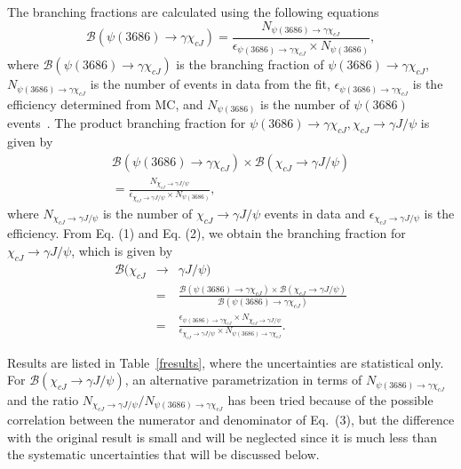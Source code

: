 \documentclass[aps,prd,twocolumn,showpacs,floatfix,byrevtex]{revtex4-1}
\begin{document}
The branching fractions are calculated using the
following equations
\begin{equation}
\mathcal{B}(\psi(3686) \to \gamma \chi_{cJ}) = \frac{N_{\psi(3686) \to
  \gamma \chi_{cJ}}}{\epsilon_{\psi(3686) \to \gamma
    \chi_{cJ}}\times N_{\psi(3686)}},
\end{equation}
where $\mathcal{B}(\psi(3686) \to \gamma \chi_{cJ})$ is the branching
fraction of $\psi(3686) \to \gamma \chi_{cJ}$, $N_{\psi(3686) \to \gamma
\chi_{cJ}}$ is the number of events in data from the fit,
$\epsilon_{\psi(3686) \to \gamma \chi_{cJ}}$ is the efficiency
determined from MC, and $N_{\psi(3686)}$ is the number of $\psi(3686)$
events~\cite{Npsip}.
The product branching fraction for $\psi(3686) \to \gamma \chi_{cJ},
  \chi_{cJ} \to \gamma J/\psi$ is given by
\begin{eqnarray}
\mathcal{B}(\psi(3686) \to \gamma \chi_{cJ})\times \mathcal{B}(\chi_{cJ} \to \gamma J/\psi) \nonumber \\
 = \frac{N_{\chi_{cJ} \to
  \gamma J/\psi}}{\epsilon_{\chi_{cJ} \to \gamma
    J/\psi}\times N_{\psi(3686)}},
\end{eqnarray}
where $N_{\chi_{cJ} \to \gamma J/\psi}$ is the number of $\chi_{cJ}
\to \gamma J/\psi$ events in data and $\epsilon_{\chi_{cJ} \to \gamma
  J/\psi}$ is the efficiency.  From Eq. (1) and Eq. (2), we obtain the
branching fraction for $\chi_{cJ} \to \gamma J/\psi$, which is given by
\begin{eqnarray}
\mathcal{B}(\chi_{cJ} &\to& \gamma J/\psi) \nonumber \\
& = &\frac{\mathcal{B}(\psi(3686) \to \gamma \chi_{cJ})\times \mathcal{B}(\chi_{cJ} \to \gamma J/\psi)}{\mathcal{B}(\psi(3686) \to \gamma \chi_{cJ})} \nonumber \\
          & = &   \frac{\epsilon_{\psi(3686) \to \gamma
    \chi_{cJ}}\times N_{\chi_{cJ} \to
  \gamma J/\psi}}{\epsilon_{\chi_{cJ} \to \gamma
    J/\psi}\times N_{\psi(3686) \to
  \gamma \chi_{cJ}}}.
\end{eqnarray}


Results are listed in Table~\ref{fresults}, where the uncertainties
are statistical only.  For $\mathcal{B}(\chi_{cJ} \to \gamma J/\psi)$,
an alternative parametrization in terms of $N_{\psi(3686) \to \gamma
  \chi_{cJ}}$ and the ratio $N_{\chi_{cJ} \to \gamma
  J/\psi}/N_{\psi(3686) \to \gamma \chi_{cJ}}$ has been tried because
  of the possible correlation between the numerator and denominator of
  Eq.~(3), but the difference with the original result is small and
  will be neglected since it is much less than the systematic
  uncertainties that will be discussed below.
\end{document}
